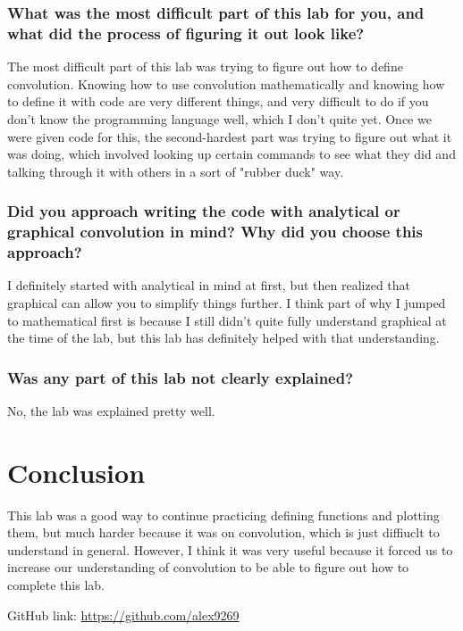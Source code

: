\documentclass[12pt]{report}
\begin{document}
 \subsubsection{What was the most difficult part of this lab for you, and what did the process of figuring it out look like?}
 
 The most difficult part of this lab was trying to figure out how to define convolution. Knowing how to use convolution mathematically and knowing how to define it with code are very different things, and very difficult to do if you don't know the programming language well, which I don't quite yet. Once we were given code for this, the second-hardest part was trying to figure out what it was doing, which involved looking up certain commands to see what they did and talking through it with others in a sort of "rubber duck" way.
 
 \subsubsection{Did you approach writing the code with analytical or graphical convolution in mind? Why did you choose this approach?}
 
 I definitely started with analytical in mind at first, but then realized that graphical can allow you to simplify things further. I think part of why I jumped to mathematical first is because I still didn't quite fully understand graphical at the time of the lab, but this lab has definitely helped with that understanding.
 
 \subsubsection{Was any part of this lab not clearly explained?}
 
 No, the lab was explained pretty well.
 
 \section{Conclusion}
 
 This lab was a good way to continue practicing defining functions and plotting them, but much harder because it was on convolution, which is just diffiuclt to understand in general. However, I think it was very useful because it forced us to increase our understanding of convolution to be able to figure out how to complete this lab. 
 
 GitHub link: \url{https://github.com/alex9269}
 
\end{document}
